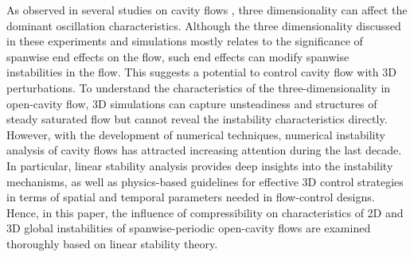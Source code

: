\documentclass{jfm}
\begin{document}

As observed in several studies on cavity flows \citep{Maull:JFM63,Ahuja:NASA95,Beresh:AIAA15,Arunajatesan:AIAA14, Beresh:JFM16, Sun:AIAA16}, three dimensionality can affect the dominant oscillation characteristics. Although the three dimensionality discussed in these experiments and simulations mostly relates to the significance of spanwise end effects on the flow, such end effects can modify spanwise instabilities in the flow. This suggests a potential to control cavity flow with 3D perturbations. To understand the characteristics of the three-dimensionality in open-cavity flow, 3D simulations can capture unsteadiness and structures of steady saturated flow but cannot reveal the instability characteristics directly. However, with the development of numerical techniques, numerical instability analysis of cavity flows has attracted increasing attention during the last decade. In particular, linear stability analysis provides deep insights into the instability mechanisms, as well as physics-based guidelines for effective 3D control strategies in terms of spatial and temporal parameters needed in flow-control designs. Hence, in this paper, the influence of compressibility on characteristics of 2D and 3D global instabilities of spanwise-periodic open-cavity flows are examined thoroughly based on linear stability theory.  
\end{document}
